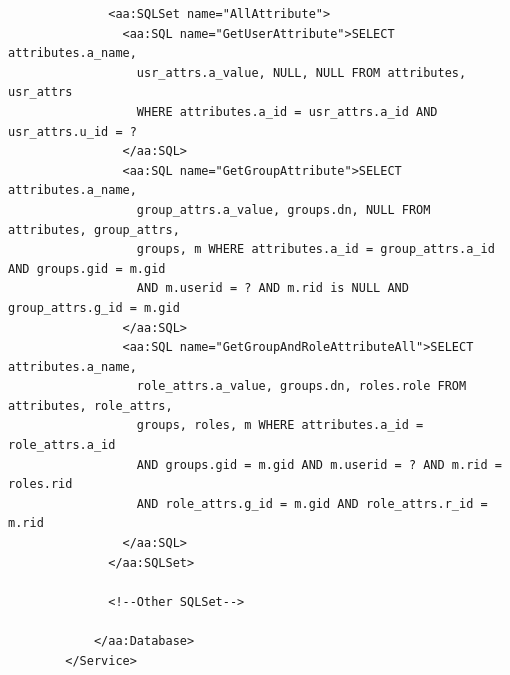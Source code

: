 \documentclass{article}                            %
\begin{document}
\begin{verbatim}
              <aa:SQLSet name="AllAttribute">
                <aa:SQL name="GetUserAttribute">SELECT attributes.a_name, 
                  usr_attrs.a_value, NULL, NULL FROM attributes, usr_attrs 
                  WHERE attributes.a_id = usr_attrs.a_id AND usr_attrs.u_id = ?
                </aa:SQL>
                <aa:SQL name="GetGroupAttribute">SELECT attributes.a_name, 
                  group_attrs.a_value, groups.dn, NULL FROM attributes, group_attrs, 
                  groups, m WHERE attributes.a_id = group_attrs.a_id AND groups.gid = m.gid 
                  AND m.userid = ? AND m.rid is NULL AND group_attrs.g_id = m.gid
                </aa:SQL>
                <aa:SQL name="GetGroupAndRoleAttributeAll">SELECT attributes.a_name, 
                  role_attrs.a_value, groups.dn, roles.role FROM attributes, role_attrs, 
                  groups, roles, m WHERE attributes.a_id = role_attrs.a_id 
                  AND groups.gid = m.gid AND m.userid = ? AND m.rid = roles.rid 
                  AND role_attrs.g_id = m.gid AND role_attrs.r_id = m.rid
                </aa:SQL>
              </aa:SQLSet>

              <!--Other SQLSet-->

            </aa:Database>
        </Service>
\end{verbatim}

\end{document}
